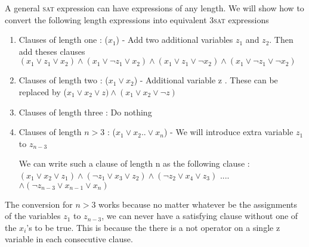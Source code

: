 \documentclass[11pt]{article}
\begin{document}
A general \textsc{sat} expression can have expressions of any length. We will show how to convert the following length expressions into equivalent \textsc{3sat} expressions
\begin{enumerate}
\item Clauses of length one : ($x_1$) - Add two additional variables $z_1$ and $z_2$. Then add theses clauses \\
$(x_1 \vee z_1 \vee x_2) \wedge
(x_1 \vee \neg z_1 \vee x_2) \wedge
(x_1 \vee  z_1 \vee \neg x_2) \wedge
(x_1 \vee \neg z_1 \vee \neg x_2)$
\item Clauses of length two : ($x_1 \vee x_2$) -  Additional variable z . These can be replaced by ($x_1 \vee x_2 \vee z) \wedge (x_1 \vee x_2 \vee \neg z)$
\item Clauses of length three : Do nothing
\item Clauses of length $n > 3$ : ($x_1 \vee x_2 .. \vee x_n$) - We will introduce extra variable $z_1$ to $z_{n-3}$ 

We can write such a clause of length n as the following clause : \\
$(x_1 \vee x_2 \vee z_1) \wedge (\neg{z_1} \vee x_3 \vee z_2) \wedge (\neg{z_2} \vee x_4 \vee z_3) $ .... $\wedge (\neg{z_{n-3}} \vee x_{n-1} \vee x_n)$
\end{enumerate}

The conversion for $n > 3$ works because no matter whatever be the assignments of the variables $z_1$ to $z_{n-3}$, we can never have a satisfying clause without one of the $x_i$'s to be true. This is because the there is a not operator on a single z variable in each consecutive clause.
\end{document}
